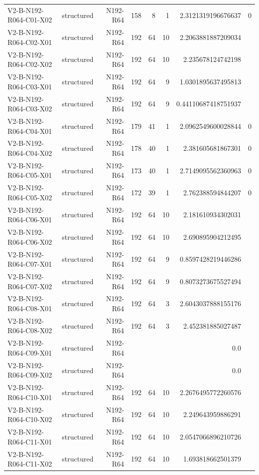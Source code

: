 {\begin{longtable}{lrrrrrrr}
V2-B-N192-R064-C01-X02 & structured & N192-R64 & 158 & 8 & 1 & 2.3121319196676637 & 0 \\
V2-B-N192-R064-C02-X01 & structured & N192-R64 & 192 & 64 & 10 & 2.2063881887209034 &  \\
V2-B-N192-R064-C02-X02 & structured & N192-R64 & 192 & 64 & 10 & 2.235678124742198 &  \\
V2-B-N192-R064-C03-X01 & structured & N192-R64 & 192 & 64 & 9 & 1.0301895637495813 &  \\
V2-B-N192-R064-C03-X02 & structured & N192-R64 & 192 & 64 & 9 & 0.44110687418751937 &  \\
V2-B-N192-R064-C04-X01 & structured & N192-R64 & 179 & 41 & 1 & 2.0962549600028844 & 0 \\
V2-B-N192-R064-C04-X02 & structured & N192-R64 & 178 & 40 & 1 & 2.381605681867301 & 0 \\
V2-B-N192-R064-C05-X01 & structured & N192-R64 & 173 & 40 & 1 & 2.7149095562360963 & 0 \\
V2-B-N192-R064-C05-X02 & structured & N192-R64 & 172 & 39 & 1 & 2.762388594844207 & 0 \\
V2-B-N192-R064-C06-X01 & structured & N192-R64 & 192 & 64 & 10 & 2.181610934302031 &  \\
V2-B-N192-R064-C06-X02 & structured & N192-R64 & 192 & 64 & 10 & 2.690895904212495 &  \\
V2-B-N192-R064-C07-X01 & structured & N192-R64 & 192 & 64 & 9 & 0.8597428219446286 &  \\
V2-B-N192-R064-C07-X02 & structured & N192-R64 & 192 & 64 & 9 & 0.8073273675527494 &  \\
V2-B-N192-R064-C08-X01 & structured & N192-R64 & 192 & 64 & 3 & 2.6043037888155176 &  \\
V2-B-N192-R064-C08-X02 & structured & N192-R64 & 192 & 64 & 3 & 2.452381885027487 &  \\
V2-B-N192-R064-C09-X01 & structured & N192-R64 &  &  &  & 0.0 &  \\
V2-B-N192-R064-C09-X02 & structured & N192-R64 &  &  &  & 0.0 &  \\
V2-B-N192-R064-C10-X01 & structured & N192-R64 & 192 & 64 & 10 & 2.2676495772260576 &  \\
V2-B-N192-R064-C10-X02 & structured & N192-R64 & 192 & 64 & 10 & 2.249643959886291 &  \\
V2-B-N192-R064-C11-X01 & structured & N192-R64 & 192 & 64 & 10 & 2.0547066896210726 &  \\
V2-B-N192-R064-C11-X02 & structured & N192-R64 & 192 & 64 & 10 & 1.693818662501379 &  \\

\end{longtable}}
